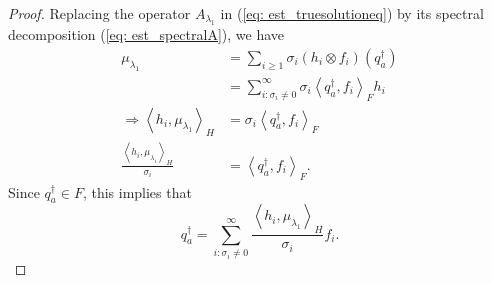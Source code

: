 \begin{proof}
    Replacing the operator $A_{\lambda_1}$ in (\ref{eq: est_truesolutioneq}) by its spectral decomposition (\ref{eq: est_spectralA}), 
    we have 
    \begin{align*}
        \mu_{\lambda_1} &= \sum_{i\geq 1}\sigma_i (h_i\otimes f_i)(q_a^{\dagger}) \\
                        &= \sum_{i:\sigma_i\neq 0}^{\infty} \sigma_i \left\langle q_a^{\dagger},f_i\right\rangle _F h_i \\
        \Longrightarrow\left\langle h_i, \mu_{\lambda_1}\right\rangle _H &= \sigma_i \left\langle q_a^{\dagger},f_i\right\rangle _F \\
        \frac{\left\langle h_i, \mu_{\lambda_1}\right\rangle _H}{\sigma_i} &= \left\langle q_a^{\dagger},f_i\right\rangle _F.              
    \end{align*}
    Since $q_a^{\dagger}\in F$, this implies that 
    \begin{equation}
        \label{eq: est_truesolutiondecomposition}
        q_a^{\dagger} = \sum_{i:\sigma_i\neq 0}^{\infty} \frac{\left\langle h_i, \mu_{\lambda_1}\right\rangle _H}{\sigma_i} f_i. 
    \end{equation}


\end{proof}

